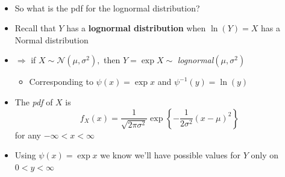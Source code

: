 \documentclass[smaller]{beamer}\usepackage[]{graphicx}\usepackage[]{color}
\newcommand{\N}{\mathcal{N}}
\newenvironment{stepitemize}{\begin{itemize}[<+->]}{\end{itemize} }
\begin{document}
\begin{frame}{\secname}
  \framesubtitle{\subsecname}

  \begin{example}
  \begin{footnotesize}
  \begin{itemize}
  \item So what is the pdf for the lognormal distribution?

  \item Recall that $Y$ has a \textbf{lognormal distribution} when $\ln \left(
  Y\right) =X$ has a Normal distribution

  \item $\Rightarrow $ if $X\sim \N\left( \mu ,\sigma ^{2}\right) ,$ then $%
  Y=\exp X \sim $ \emph{lognormal}$\left( \mu ,\sigma ^{2}\right) $

  \begin{stepitemize}
  \item Corresponding to $\psi \left( x\right) =\exp x$ and $\psi
  ^{-1}\left( y\right) =\ln (y)$
  \end{stepitemize}

  \item The \emph{pdf} of $X$ is
  \begin{equation*}
  f_{X}\left( x\right) =\frac{1}{\sqrt{2\pi \sigma ^{2}}}\exp{ \left\{ -\frac{1%
  }{2\sigma ^{2}}\left( x-\mu \right) ^{2}\right\}}
  \end{equation*}%
  for any $-\infty <x<\infty $

  \item Using $\psi \left( x\right) =\exp x$ we know we'll have possible
  values for $Y$ only on $0<y<\infty $
  \end{itemize}
  \end{footnotesize}
  \end{example}
\end{frame}
\end{document}

